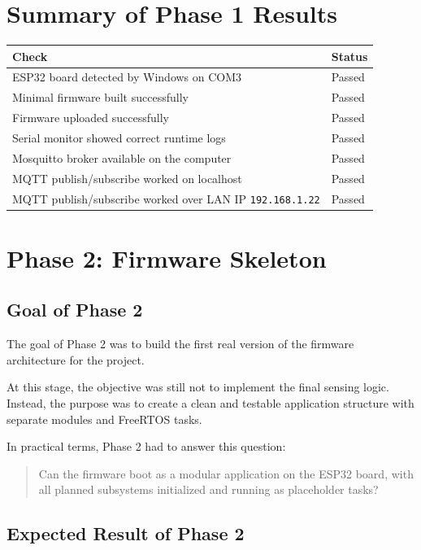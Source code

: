 \documentclass[12pt,a4paper]{article}
\begin{document}
\section{Summary of Phase 1 Results}

\begin{longtable}{|>{\raggedright\arraybackslash}p{}|>{\raggedright\arraybackslash}p{}|}
\hline
\textbf{Check} & \textbf{Status} \\
\hline
ESP32 board detected by Windows on COM3 & Passed \\
\hline
Minimal firmware built successfully & Passed \\
\hline
Firmware uploaded successfully & Passed \\
\hline
Serial monitor showed correct runtime logs & Passed \\
\hline
Mosquitto broker available on the computer & Passed \\
\hline
MQTT publish/subscribe worked on localhost & Passed \\
\hline
MQTT publish/subscribe worked over LAN IP \texttt{192.168.1.22} & Passed \\
\hline
\end{longtable}

\section{Phase 2: Firmware Skeleton}

\subsection{Goal of Phase 2}

The goal of Phase 2 was to build the first real version of the firmware
architecture for the project.

At this stage, the objective was still not to implement the final sensing
logic. Instead, the purpose was to create a clean and testable application
structure with separate modules and FreeRTOS tasks.

In practical terms, Phase 2 had to answer this question:

\begin{quote}
Can the firmware boot as a modular application on the ESP32 board, with all
planned subsystems initialized and running as placeholder tasks?
\end{quote}

\subsection{Expected Result of Phase 2}
\end{document}
